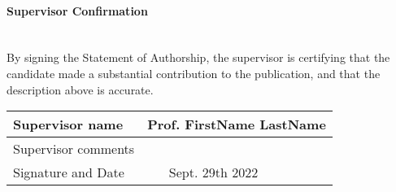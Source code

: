 \paragraph{{\color{tcolor} Supervisor Confirmation}} \mbox{}\\
By signing the Statement of Authorship, 
the supervisor is certifying that the candidate 
made a substantial contribution to the publication, 
and that the description above is accurate.

\begin{table*}[h!]
    \centering
    \small
    \begin{tabular}{| p{} | p{} | p{} |}
        \hline
        Supervisor name & \multicolumn{2}{p{0.6\textwidth}|}{Prof. FirstName LastName} \\ \hline
        Supervisor comments & \multicolumn{2}{p{0.6\textwidth}|}{} \\ \hline
        Signature and Date & & Sept. 29th 2022 \\ \hline
    \end{tabular}
\end{table*}
